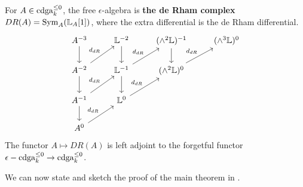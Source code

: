 \begin{eg}
\label{eg:de_rham}
For $A \in \operatorname{cdga}_k^{\leq 0}$, the free $\epsilon$-algebra is \textbf{the de Rham complex} $DR(A) = \operatorname{Sym}_A(\mathbb L_A[1])$,
where the extra differential is the de Rham differential.
\[
\begin{tikzcd}
A^{-3}\arrow{d} & \bbL^{-2}\arrow{d} & (\wedge^2 \bbL)^{-1}\arrow{d} & (\wedge^3 \bbL)^0 \\
A^{-2}\arrow{d}\arrow{ur}{d_{dR}} & \bbL^{-1}\arrow{d}\arrow{ur}{d_{dR}} & (\wedge^2 \bbL)^{0}\arrow{ur}{d_{dR}} & \\
A^{-1}\arrow{d}\arrow{ur}{d_{dR}} & \bbL^0\arrow{ur}{d_{dR}} & & \\
A^0\arrow{ur}{d_{dR}} & & &
\end{tikzcd}
\]
The functor $A \mapsto DR(A)$ is left adjoint to the forgetful functor $\epsilon-\operatorname{cdga}_k^{\leq 0}
\to \operatorname{cdga}_k^{\leq 0}$.
\end{eg}

We can now state and sketch the proof of the main theorem in \cite{TV_HKR}.


